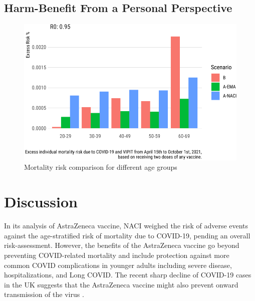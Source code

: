 \documentclass[]{interact}
\theoremstyle{plain}%
\theoremstyle{definition}
\theoremstyle{remark}
\begin{document}
\hypertarget{harm-benefit-from-a-personal-perspective}{%
\subsection{Harm-Benefit From a Personal
Perspective}\label{harm-benefit-from-a-personal-perspective}}

\begin{figure}
\centering
\includegraphics{theCaseforAZ_files/figure-latex/covidvsvipit-1.pdf}
\caption{Mortality risk comparison for different age groups}
\end{figure}

\hypertarget{discussion}{%
\section{Discussion}\label{discussion}}

In its analysis of AstraZeneca vaccine, NACI weighed the risk of adverse
events against the age-stratified risk of mortality due to COVID-19,
pending an overall risk-assessment. However, the benefits of the
AstraZeneca vaccine go beyond preventing COVID-related mortality and
include protection against more common COVID complications in younger
adults including severe disease, hospitalizations, and Long COVID. The
recent sharp decline of COVID-19 cases in the UK suggests that the
AstraZeneca vaccine might also prevent onward transmission of the virus
\citep{our_world_in_data_covid-19_2021}.
\end{document}
